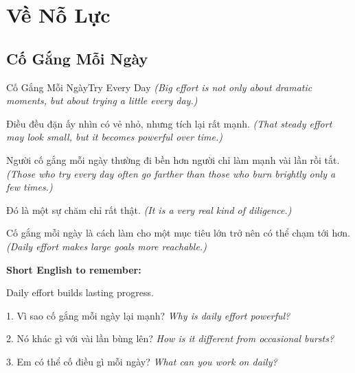\chapter{Về Nỗ Lực}

\section{Cố Gắng Mỗi Ngày}
\begin{truyen}{Cố Gắng Mỗi Ngày}{Try Every Day}
\textit{(Big effort is not only about dramatic moments, but about trying a little every day.)}

Điều đều đặn ấy nhìn có vẻ nhỏ, nhưng tích lại rất mạnh.
\textit{(That steady effort may look small, but it becomes powerful over time.)}

Người cố gắng mỗi ngày thường đi bền hơn người chỉ làm mạnh vài lần rồi tắt.
\textit{(Those who try every day often go farther than those who burn brightly only a few times.)}

Đó là một sự chăm chỉ rất thật.
\textit{(It is a very real kind of diligence.)}
\end{truyen}

\begin{baihoc}
Cố gắng mỗi ngày là cách làm cho một mục tiêu lớn trở nên có thể chạm tới hơn.
\textit{(Daily effort makes large goals more reachable.)}
\end{baihoc}

\begin{ghinhoanh}
\textbf{Short English to remember:}

Daily effort builds lasting progress.

\end{ghinhoanh}

\begin{tuhocnhanh}
1. Vì sao cố gắng mỗi ngày lại mạnh? \textit{Why is daily effort powerful?}

2. Nó khác gì với vài lần bùng lên? \textit{How is it different from occasional bursts?}

3. Em có thể cố điều gì mỗi ngày? \textit{What can you work on daily?}
\end{tuhocnhanh}
\ngancach

